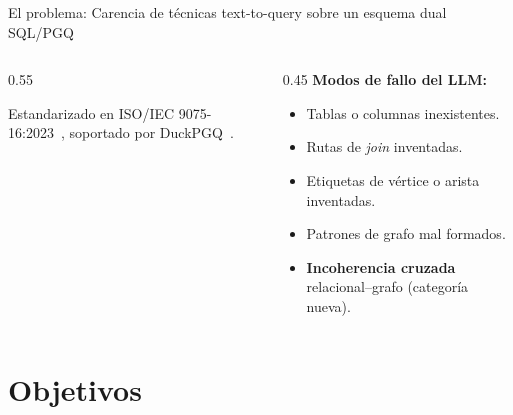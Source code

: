 \documentclass[aspectratio=169]{beamer}
\begin{document}
\begin{frame}{El problema: Carencia de técnicas text-to-query sobre un esquema dual SQL/PGQ}
\begin{columns}[T]
\begin{column}{0.55\textwidth}
\centering
{}

\vspace{0.3cm}
\scriptsize Estandarizado en ISO/IEC 9075-16:2023~\parencite{ISO9075_16_2023}, soportado por DuckPGQ~\parencite{DuckPGQ}.
\end{column}
\begin{column}{0.45\textwidth}
\textbf{Modos de fallo del LLM:}
\begin{itemize}\footnotesize
    \item Tablas o columnas inexistentes.
    \item Rutas de \emph{join} inventadas.
    \item Etiquetas de vértice o arista inventadas.
    \item Patrones de grafo mal formados.
    \item \textcolor{tkRed}{\textbf{Incoherencia cruzada}} relacional--grafo (categoría nueva).
\end{itemize}
\end{column}
\end{columns}
\end{frame}

\section{Objetivos}
\end{document}
